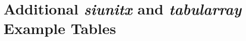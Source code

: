 



\section{Additional \textit{siunitx} and \textit{tabularray} Example Tables}
\label{sec:app:example_tables}

\vfill

\begin{table}[h!]
	\caption{An~Example of a~Regression Table (Adapted from \citealp{Gerhardt2017}). Remember to Mention the Dependent Variable!}
	\label{tab:lin_reg_interactions}
	
\end{table}

\vfill

\begin{table}[h!]
	\caption{Figure Grouping via \texttt{siunitx} in a~Table}
	
\end{table}

\vfill

\newpage

\vphantom{\LARGE\strut}

\vfill

\begin{table}[h!]
	\caption{Overview of the Choice Lists Presented to Subjects (Adapted from \citealp{Gerhardt2017})}
	\label{tab:choice_lists}%
	
\end{table}%

\vfill

\newpage

\begingroup

